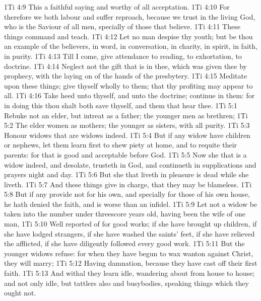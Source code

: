 \vs 1Ti 4:9 This  a faithful saying and worthy of all acceptation.
\vs 1Ti 4:10 For therefore we both labour and suffer reproach, because we trust in the living God, who is the Saviour of all men, specially of those that believe.
\vs 1Ti 4:11 These things command and teach.
\vs 1Ti 4:12 Let no man despise thy youth; but be thou an example of the believers, in word, in conversation, in charity, in spirit, in faith, in purity.
\vs 1Ti 4:13 Till I come, give attendance to reading, to exhortation, to doctrine.
\vs 1Ti 4:14 Neglect not the gift that is in thee, which was given thee by prophecy, with the laying on of the hands of the presbytery.
\vs 1Ti 4:15 Meditate upon these things; give thyself wholly to them; that thy profiting may appear to all.
\vs 1Ti 4:16 Take heed unto thyself, and unto the doctrine; continue in them: for in doing this thou shalt both save thyself, and them that hear thee.
\vs 1Ti 5:1 Rebuke not an elder, but intreat  as a father;  the younger men as brethren;
\vs 1Ti 5:2 The elder women as mothers; the younger as sisters, with all purity.
\vs 1Ti 5:3 Honour widows that are widows indeed.
\vs 1Ti 5:4 But if any widow have children or nephews, let them learn first to shew piety at home, and to requite their parents: for that is good and acceptable before God.
\vs 1Ti 5:5 Now she that is a widow indeed, and desolate, trusteth in God, and continueth in supplications and prayers night and day.
\vs 1Ti 5:6 But she that liveth in pleasure is dead while she liveth.
\vs 1Ti 5:7 And these things give in charge, that they may be blameless.
\vs 1Ti 5:8 But if any provide not for his own, and specially for those of his own house, he hath denied the faith, and is worse than an infidel.
\vs 1Ti 5:9 Let not a widow be taken into the number under threescore years old, having been the wife of one man,
\vs 1Ti 5:10 Well reported of for good works; if she have brought up children, if she have lodged strangers, if she have washed the saints' feet, if she have relieved the afflicted, if she have diligently followed every good work.
\vs 1Ti 5:11 But the younger widows refuse: for when they have begun to wax wanton against Christ, they will marry;
\vs 1Ti 5:12 Having damnation, because they have cast off their first faith.
\vs 1Ti 5:13 And withal they learn  idle, wandering about from house to house; and not only idle, but tattlers also and busybodies, speaking things which they ought not.

